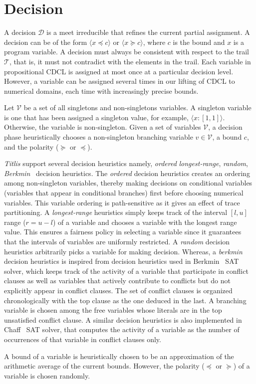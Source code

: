 \section{Decision}
A decision $\mathcal{D}$ is a meet irreducible that refines the 
current partial assignment.  A decision can be of the form 
$\langle x \preceq c \rangle$ or $\langle x \succeq c \rangle$, 
where $c$ is the bound and $x$ is a program variable.  A 
decision must always be consistent with respect to the 
trail $\mathcal{T}$, that is, it must not contradict with 
the elements in the trail.  Each variable in propositional CDCL 
is assigned at most once at a particular decision level.  However, 
a variable can be assigned several times in our lifting of CDCL to 
numerical domains, each time with increasingly precise bounds.  

Let $\mathcal{V}$ be a set of all singletons and non-singletons 
variables.  A singleton variable is one that has been assigned a 
singleton value, for example, $\langle x:[1,1] \rangle$.  Otherwise, 
the variable is non-singleton.  Given a set of variables $\mathcal{V}$, 
a decision phase heuristically chooses a non-singleton branching 
variable $v \in \mathcal{V}$, a bound $c$, and the polarity ($\succeq$ or 
$\preceq$).  

{\em Titlis} support several decision heuristics namely, {\em ordered} 
{\em longest-range}, {\em random}, {\em Berkmin}~\cite{} decision heuristics.  
The {\em ordered} decision heuristics creates an ordering among non-singleton 
variables, thereby making decisions on conditional variables (variables that 
appear in conditional branches) first before choosing numerical variables.  
This variable ordering is path-sensitive as it gives an effect of trace
partitioning.  A {\em longest-range} heuristics simply keeps track of the
interval $[l,u]$ range ($r=u-l$) of a variable and chooses a variable with 
the longest range value.  This ensures a fairness policy in selecting a 
variable since it guarantees that the intervals of variables are uniformly 
restricted.  A {\em random} decision heuristics arbitrarily picks a variable 
for making decision.  Whereas, a {\em berkmin} decision heuristics is inspired 
from decision heuristics used in Berkmin~\cite{eugoldberg07} SAT solver, which 
keeps track of the activity of a variable that participate in conflict clauses 
as well as variables that actively contribute to conflicts but do not explicitly 
appear in conflict clauses.  The set of conflict clauses is organized 
chronologically with the top clause as the one deduced in the last.  A 
branching variable is chosen among the free variables whose literals are 
in the top unsatisfied conflict clause.  A similar decision heuristics is 
also implemented in Chaff~\cite{chaff} SAT solver, that computes the activity 
of a variable as the number of occurrences of that variable in conflict 
clauses only.  

A bound of a variable is heuristically chosen to be an approximation of the 
arithmetic average of the current bounds.  However, the polarity ($\preceq$ or
$\succeq$) of a variable is chosen randomly.  
